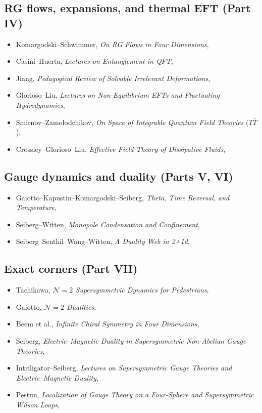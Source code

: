 \subsection*{RG flows, expansions, and thermal EFT (Part IV)}
\begin{itemize}
\item[$\circ$] Komargodski--Schwimmer, \emph{On RG Flows in Four Dimensions}, 
\item[$\bullet$] Casini--Huerta, \emph{Lectures on Entanglement in QFT}, 
\item[$\bullet$] Jiang, \emph{Pedagogical Review of Solvable Irrelevant Deformations}, 
\item[$\bullet$] Glorioso--Liu, \emph{Lectures on Non-Equilibrium EFTs and Fluctuating Hydrodynamics}, 
\item[$\circ$] Smirnov--Zamolodchikov, \emph{On Space of Integrable Quantum Field Theories} ($T\bar T$), 
\item[$\circ$] Crossley--Glorioso--Liu, \emph{Effective Field Theory of Dissipative Fluids}, 
\end{itemize}

\subsection*{Gauge dynamics and duality (Parts V, VI)}
\begin{itemize}
\item[$\circ$] Gaiotto--Kapustin--Komargodski--Seiberg, \emph{Theta, Time Reversal, and Temperature}, 
\item[$\circ$] Seiberg--Witten, \emph{Monopole Condensation and Confinement}, 
\item[$\circ$] Seiberg--Senthil--Wang--Witten, \emph{A Duality Web in 2+1d}, 
\end{itemize}

\subsection*{Exact corners (Part VII)}
\begin{itemize}
\item[$\bullet$] Tachikawa, \emph{$\mathcal{N}=2$ Supersymmetric Dynamics for Pedestrians}, 
\item[$\circ$] Gaiotto, \emph{$\mathcal{N}=2$ Dualities}, 
\item[$\circ$] Beem et al., \emph{Infinite Chiral Symmetry in Four Dimensions}, 
\item[$\circ$] Seiberg, \emph{Electric--Magnetic Duality in Supersymmetric Non-Abelian Gauge Theories}, 
\item[$\bullet$] Intriligator--Seiberg, \emph{Lectures on Supersymmetric Gauge Theories and Electric--Magnetic Duality}, 
\item[$\circ$] Pestun, \emph{Localization of Gauge Theory on a Four-Sphere and Supersymmetric Wilson Loops}, 
\end{itemize}

